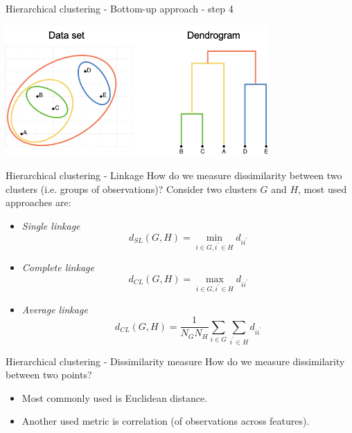 \documentclass[notes]{beamer}          %
\begin{document}
\begin{frame}{Hierarchical clustering - Bottom-up approach - step 4}
\begin{center}
\includegraphics[height=5cm]{../figures/week_6/HierarchicalClustering_5.png}  
\end{center}
\end{frame}

\begin{frame}{Hierarchical clustering - Linkage}
How do we measure dissimilarity between two clusters (i.e. groups of observations)?
Consider two clusters $G$ and $H$, most used approaches are: 
\begin{itemize}
\item \textit{Single linkage}
\begin{equation*}
	d_{SL}(G, H) = \min_{i \in G, i^\prime \in H} d_{ii^\prime}
\end{equation*}
\item \textit{Complete linkage}
\begin{equation*}
	d_{CL}(G, H) = \max_{i \in G, i^\prime \in H} d_{ii^\prime}
\end{equation*}
\item \textit{Average linkage}
\begin{equation*}
	d_{CL}(G, H) = \frac{1}{N_G N_H} \sum_{i \in G} \sum_{i^\prime \in H}  d_{ii^\prime}
\end{equation*}
\end{itemize}
\end{frame}

\begin{frame}{Hierarchical clustering - Dissimilarity measure}
How do we measure dissimilarity between two points?
\begin{itemize}
\item  Most commonly used is Euclidean distance.
\item Another used metric is correlation (of observations across features).
\end{itemize}
\end{frame}
\end{document}
